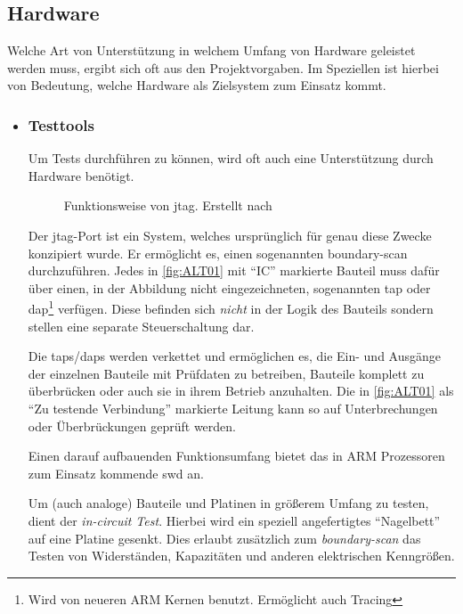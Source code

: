 \subsection{Hardware}\label{sub:hardware}
Welche Art von Unterstützung in welchem Umfang von Hardware geleistet werden
muss, ergibt sich oft aus den Projektvorgaben. Im Speziellen ist hierbei von
Bedeutung, welche Hardware als Zielsystem zum Einsatz kommt.
\begin{itemize}
  \item \subsubsection*{Testtools} Um Tests durchführen zu können, wird
  oft auch eine Unterstützung durch Hardware benötigt. 
  \begin{figure}[!h]
    \centering
    \def\svgwidth{\columnwidth}
    
    \caption{Funktionsweise von \gls{jtag}. Erstellt nach \cite{ALT01}}
    \label{fig:ALT01}
  \end{figure}
  Der \gls{jtag}-Port ist ein System, welches ursprünglich für genau diese
  Zwecke konzipiert wurde. Er ermöglicht es, einen sogenannten boundary-scan
  durchzuführen. Jedes in \autoref{fig:ALT01} mit "`IC"' markierte Bauteil muss
  dafür über einen, in der Abbildung nicht eingezeichneten, sogenannten \gls{tap} oder
  \gls{dap}\footnote{Wird von neueren ARM Kernen benutzt.
  Ermöglicht auch Tracing} verfügen. Diese befinden sich \emph{nicht} in der
  Logik des Bauteils sondern stellen eine separate Steuerschaltung dar.
  
  Die \glspl{tap}/\glspl{dap} werden verkettet und ermöglichen es, die Ein-
  und Ausgänge der einzelnen Bauteile mit Prüfdaten zu betreiben, Bauteile komplett
  zu überbrücken oder auch sie in ihrem Betrieb anzuhalten.
  Die in \autoref{fig:ALT01} als "`Zu testende Verbindung"' markierte Leitung
  kann so auf Unterbrechungen oder Überbrückungen geprüft werden.
  
  Einen darauf aufbauenden Funktionsumfang bietet das in ARM
  Prozessoren zum Einsatz kommende \gls{swd} an.
  
  Um (auch analoge) Bauteile und Platinen in größerem Umfang zu testen, dient
  der \emph{in-circuit Test}. Hierbei wird ein speziell angefertigtes
  "`Nagelbett"' auf eine Platine gesenkt. Dies erlaubt zusätzlich zum
  \emph{boundary-scan} das Testen von Widerständen, Kapazitäten und anderen
  elektrischen Kenngrößen.
   

\end{itemize}
